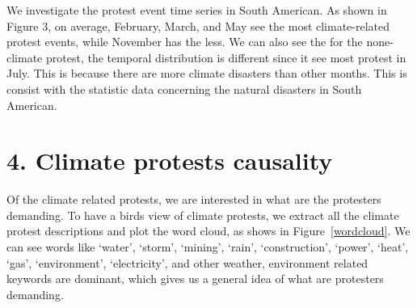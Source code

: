 \documentclass[9pt,twocolumn,twoside]{pnas-new}
\begin{document}
We investigate the protest event time series in South American. As shown in Figure 3, on average, February, March, and May see the most climate-related protest events, while November has the less. We can also see the for the none-climate protest, the temporal distribution is different since it see most protest in July. This is because there are more climate disasters than other months. This is consist with the statistic data concerning the natural disasters in South American.









%


\section*{4. Climate protests causality}
Of the climate related protests, we are interested in what are the protesters demanding. To have a birds view of climate protests, we extract all the climate protest descriptions and plot the word cloud, as shows in Figure~\ref{wordcloud}. We can see words like `water', `storm', `mining', `rain', `construction', `power', `heat', `gas', `environment', `electricity', and other weather, environment related keywords are dominant, which gives us a general idea of what are protesters demanding.
\end{document}
